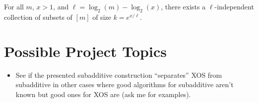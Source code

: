   \begin{lemma} \label{lem:l-indep-exist} For all $m$, $x > 1$, and $\ell =
  \log_2(m) - \log_2(x)$, there exists a $\ell$-independent collection of subsets
  of $[m]$ of size $k = e^{x/\ell}$.  \end{lemma}

\section{Possible Project Topics} 
  \begin{itemize} \item See if the presented
      subadditive construction ``separates'' XOS from subadditive in other cases
      where good algorithms for subadditive aren't known but good ones for XOS
      are (ask me for examples).
  \end{itemize}

 



